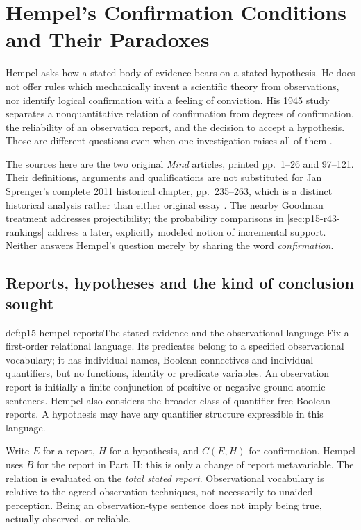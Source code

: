 \chapter{Hempel's Confirmation Conditions and Their Paradoxes}
\label{sec:p15-hempel-confirmation-and-paradoxes}

Hempel asks how a stated body of evidence bears on a stated hypothesis.
He does not offer rules which mechanically invent a scientific theory from
observations, nor identify logical confirmation with a feeling of conviction.
His 1945 study separates a nonquantitative relation of confirmation from
degrees of confirmation, the reliability of an observation report, and the
decision to accept a hypothesis. Those are different questions even when
one investigation raises all of them
\parencite[I, \S\S1--2, pp.~1--9]{Hempel1945ConfirmationI}.

The sources here are the two original \emph{Mind} articles, printed
pp.~1--26 and 97--121. Their definitions, arguments and qualifications are
not substituted for Jan Sprenger's complete 2011 historical chapter,
pp.~235--263, which is a distinct historical analysis rather than either
original essay
\parencite{Sprenger2011HempelConfirmation}. The nearby Goodman treatment
addresses projectibility; the probability comparisons in
\cref{sec:p15-r43-rankings} address a later, explicitly modeled notion of
incremental support. Neither answers Hempel's question merely by sharing
the word \emph{confirmation}.

\section{Reports, hypotheses and the kind of conclusion sought}
\label{sec:p15-hempel-task}

\begin{hbdefinition}{def:p15-hempel-reports}{The stated evidence and the observational language}
Fix a first-order relational language. Its predicates belong to a specified
observational vocabulary; it has individual names, Boolean connectives and
individual quantifiers, but no functions, identity or predicate variables.
An observation report is initially a finite conjunction of positive or
negative ground atomic sentences. Hempel also considers the broader class
of quantifier-free Boolean reports. A hypothesis may have any quantifier
structure expressible in this language.

Write $E$ for a report, $H$ for a hypothesis, and $C(E,H)$ for confirmation.
Hempel uses $B$ for the report in Part~II; this is only a change of report
metavariable. The relation is evaluated on the \emph{total stated report}.
Observational vocabulary is relative to the agreed observation techniques,
not necessarily to unaided perception. Being an observation-type sentence
does not imply being true, actually observed, or reliable.
\end{hbdefinition}

